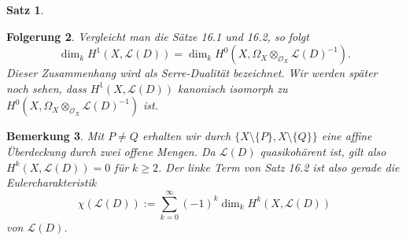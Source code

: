 \documentclass[11pt]{book}
\newtheorem{theorem}{Satz}[section]
\newtheorem{remark}[theorem]{Bemerkung}
\newtheorem{folg}[theorem]{Folgerung}
\theoremstyle{nonumberbreak}
\newenvironment{pr}[1][]{\ifthenelse{\equal{#1}{}}{\proof}{\proof[#1]}\rm}{\endproof}
\begin{document}
\begin{spacing}{1.4}
\begin{theorem}
\begin{pr}
\end{pr}


\end{theorem}





\begin{folg}
Vergleicht man die Sätze 16.1 und 16.2, so folgt 
$$\dim_k H^{1}(X, \mathcal{L}(D)) = \dim_k H^{0}(X, \Omega_X \otimes_{\mathcal{O}_X} \mathcal{L}(D)^{-1}).$$
Dieser Zusammenhang wird als \textit{Serre-Dualität} bezeichnet. Wir werden später noch sehen, dass $H^{1}(X, \mathcal{L}(D))$ kanonisch isomorph zu $H^{0}(X, \Omega_X \otimes_{\mathcal{O}_X} \mathcal{L}(D)^{-1})$ ist.
\end{folg}

\begin{remark}

Mit $P\neq Q$ erhalten wir durch $\{X\setminus \{P\}, X\setminus \{Q\} \}$ eine affine Überdeckung durch zwei offene Mengen. Da $\mathcal{L}(D)$ quasikohärent ist, gilt also 
$H^{k}(X, \mathcal{L}(D)) = 0$
für $k \geqslant 2$. Der linke Term von Satz 16.2 ist also gerade die \textit{Eulercharakteristik}
$$\chi(\mathcal{L}(D)) := \sum_{k=0}^{\infty} (-1)^k \dim_k H^{k}(X, \mathcal{L}(D))$$
von $\mathcal{L}(D)$. 

\end{remark}



\end{spacing}
\end{document}
